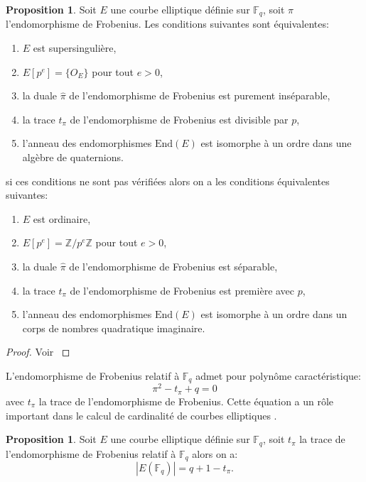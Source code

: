 \documentclass[10pt,a4paper]{book}
\theoremstyle{plain}
\theoremstyle{definition}
\theoremstyle{definition}
\theoremstyle{definition}
\newtheorem{prop}[thm]{Proposition}
\theoremstyle{definition}
\theoremstyle{remark}
\theoremstyle{remark}
\theoremstyle{definition}
\begin{document}
\begin{prop}
\label{pro:fro:dis}
Soit $E$ une courbe elliptique définie sur $\mathbb{F}_q$, soit $\pi$ l'endomorphisme de Frobenius. Les conditions suivantes sont équivalentes:
\begin{enumerate}
\item $E$ est supersingulière,
\item $E[p^e]=\{O_E\}$ pour tout $e > 0$,
\item la duale $\widehat{\pi}$ de l'endomorphisme de Frobenius est purement inséparable,
\item la trace $t_{\pi}$ de l'endomorphisme de Frobenius est divisible par $p$,
\item l'anneau des endomorphismes $\mathrm{End}(E)$ est isomorphe à un ordre dans une algèbre de quaternions.
\end{enumerate}
si ces conditions ne sont pas vérifiées alors on a les conditions équivalentes suivantes:
\begin{enumerate}
\item $E$ est ordinaire,
\item $E[p^e]=\mathbb{Z}/p^e\mathbb{Z}$ pour tout $e > 0$,
\item la duale $\widehat{\pi}$ de l'endomorphisme de Frobenius est séparable,
\item la trace $t_{\pi}$ de l'endomorphisme de Frobenius est première avec $p$,
\item l'anneau des endomorphismes $\mathrm{End}(E)$ est isomorphe à un ordre dans un corps de nombres quadratique imaginaire.
\end{enumerate}
\end{prop}

\begin{proof}
Voir \cite[Theorem V.3.1]{Silv1}
\end{proof}

L'endomorphisme de Frobenius relatif à $\mathbb{F}_q$ admet pour polynôme caractéristique:
\begin{equation}
\pi^2-t_{\pi}+q=0
\end{equation}
avec $t_{\pi}$ la trace de l'endomorphisme de Frobenius. Cette équation a un rôle important dans le calcul de cardinalité de courbes elliptiques \cite{Schoof85}.

\begin{prop}
Soit $E$ une courbe elliptique définie sur $\mathbb{F}_q$, soit $t_{\pi}$ la trace de l'endomorphisme de Frobenius relatif à $ \mathbb{F}_q$ alors on a:
\begin{equation*}
|E(\mathbb{F}_q)|=q+1-t_{\pi}.
\end{equation*}
\end{prop}
\end{document}
